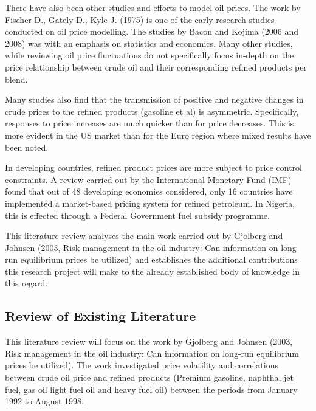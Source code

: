\documentclass[a4paper,10pt]{article}
\begin{document}
There have also been other studies and efforts to model oil prices. The work by Fischer D., Gately D., Kyle J. (1975)\cite{fis75} is one of the early research studies conducted on oil price modelling.  The studies by Bacon and Kojima (2006 and 2008)\cite{bac06, bac08} was with an emphasis on statistics and economics. Many other studies, while reviewing oil price fluctuations do not specifically focus in-depth on the price relationship between crude oil and their corresponding refined products per blend.

Many studies also find that the transmission of positive and negative changes in crude prices to the refined products (gasoline et al) is asymmetric\cite{bor97, pol16}. Specifically, responses to price increases are much quicker than for price decreases. This is more evident in the US market than for the Euro region where mixed results have been noted.

In developing countries, refined product prices are more subject to price control constraints. A review carried out by the International Monetary Fund (IMF) found that out of 48 developing economies considered, only 16 countries have implemented a market-based pricing system for refined petroleum\cite{coa06}. In Nigeria, this is effected through a Federal Government fuel subsidy programme.

This literature review analyses the main work carried out by Gjolberg and Johnsen (2003, Risk management in the oil industry: Can information on long-run equilibrium prices be utilized)\cite{joh99} and establishes the additional contributions this research project will make to the already established body of knowledge in this regard.

\subsection{Review of Existing Literature}
This literature review will focus on the work by Gjolberg and Johnsen (2003, Risk management in the oil industry: Can information on long-run equilibrium prices be utilized)\cite{gjo03}. The work investigated price volatility and correlations between crude oil price and refined products (Premium gasoline, naphtha, jet fuel, gas oil light fuel oil and heavy fuel oil) between the periods from January 1992 to August 1998.
\end{document}
